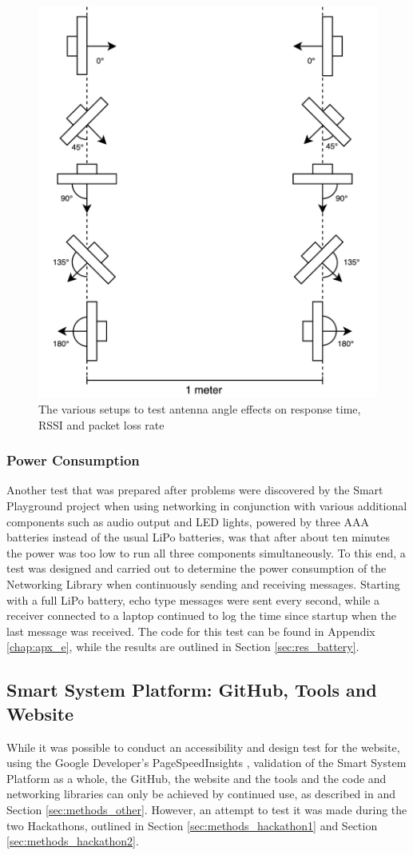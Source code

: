 \begin{figure}[H]
    \centering
    \includegraphics[width=0.5\linewidth]{overleaf/images/angletest.drawio.png}
    \vspace{\ftspace}
    \caption{The various setups to test antenna angle effects on response time, RSSI and packet loss rate}
    \label{fig:angle}
\end{figure}

\subsubsection{\label{sec:methods_test_batter}Power Consumption}
Another test that was prepared after problems were discovered by the Smart Playground project when using networking in conjunction with various additional components such as audio output and LED lights, powered by three AAA batteries instead of the usual LiPo batteries, was that after about ten minutes the power was too low to run all three components simultaneously. To this end, a test was designed and carried out to determine the power consumption of the Networking Library when continuously sending and receiving messages. Starting with a full LiPo battery, echo type messages were sent every second, while a receiver connected to a laptop continued to log the time since startup when the last message was received. The code for this test can be found in Appendix \ref{chap:apx_e}, while the results are outlined in Section \ref{sec:res_battery}.

\subsection{\label{sec:methods_tools}Smart System Platform: GitHub, Tools and Website}

While it was possible to conduct an accessibility and design test for the website, using the Google Developer's PageSpeedInsights \citep{noauthor_about_nodate}, validation of the Smart System Platform as a whole, the GitHub, the website and the tools and the code and networking libraries can only be achieved by continued use, as described in and Section \ref{sec:methods_other}. However, an attempt to test it was made during the two Hackathons, outlined in Section \ref{sec:methods_hackathon1} and Section \ref{sec:methods_hackathon2}.

